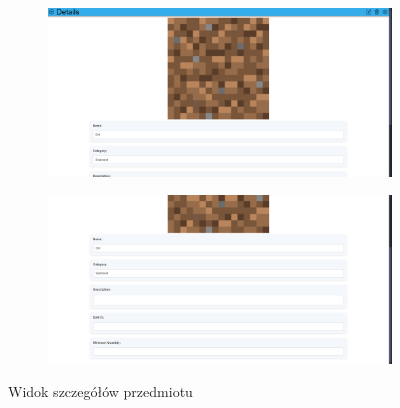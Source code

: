 \documentclass[../main.tex]{subfiles}
\begin{document}
            \begin{figure}[H]
                \begin{subfigure}{.49\textwidth}
                    \centering
                    \includegraphics[width=\getImageWidth]{images/app-desktop/app-items-details1-desktop.png}
                    \label{fig:app-items-details1-desktop}
                \end{subfigure}
                \begin{subfigure}{.49\textwidth}
                    \centering
                    \includegraphics[width=\getImageWidth]{images/app-desktop/app-items-details2-desktop.png}
                    \label{fig:app-items-details2-desktop}
                \end{subfigure}
                \caption{Widok szczegółów przedmiotu}
                \label{fig:app-items-details-desktop}
            \end{figure}
            
\end{document}

